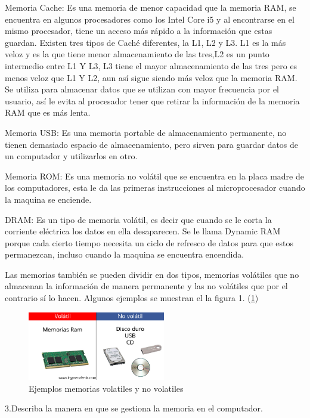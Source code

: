 \documentclass{article}
\begin{document}
Memoria Cache: Es una memoria de menor capacidad que la memoria RAM, se encuentra en algunos procesadores como los Intel Core i5 y al encontrarse en el mismo procesador, tiene un acceso más rápido a la información que estas guardan. Existen tres tipos de Caché diferentes, la L1, L2 y L3. L1 es la más veloz y es la que tiene menor almacenamiento de las tres,L2 es un punto intermedio entre L1 Y L3, L3 tiene el mayor almacenamiento de las tres pero es menos veloz que L1 Y L2, aun así sigue siendo más veloz que la memoria RAM. Se utiliza para almacenar datos que se utilizan con mayor frecuencia por el usuario, así le evita al procesador tener que retirar la información de la memoria RAM que es más lenta.\cite{YouBioit}

Memoria USB: Es una memoria portable de almacenamiento permanente, no tienen demasiado espacio de almacenamiento, pero sirven para guardar datos de un computador y utilizarlos en otro.

Memoria ROM: Es una memoria no volátil que se encuentra en la placa madre de los computadores, esta le da las primeras instrucciones al microprocesador cuando la maquina se enciende.

DRAM: Es un tipo de memoria volátil, es decir que cuando se le corta la corriente eléctrica los datos en ella desaparecen. Se le llama Dynamic RAM porque cada cierto tiempo necesita un ciclo de refresco de datos para que estos permanezcan, incluso cuando la maquina se encuentra encendida.\cite{uruguayoc}

Las memorias también se pueden dividir en dos tipos, memorias volátiles que no almacenan la información de manera permanente y las no volátiles que por el contrario sí lo hacen. Algunos ejemplos se muestran el la figura 1. (\ref{fig:Volatilidad})

\begin{figure}[h]
\includegraphics[width=6cm]{Volatilidad.jpg}
\centering
\caption{Ejemplos memorias volatiles y no volatiles}
\label{fig:Volatilidad}
\end{figure}


3.Describa la manera en que se gestiona la memoria en el computador.
\end{document}

